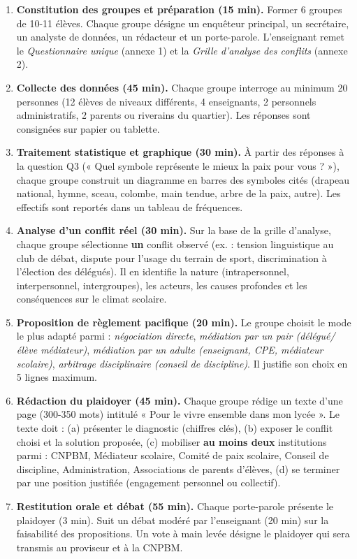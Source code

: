 \documentclass[11pt]{article}
\newcounter{popsec}
\newcounter{popsub}
\newcommand{\courssub}[1]{%
  \stepcounter{popsub}%
  \par\vspace{9pt}\noindent{\popxbold\fontsize{11.5}{13}\selectfont\color{popink}{\color{poporange}\thepopsec.\thepopsub}\hspace{6pt}#1}\par\nopagebreak\vspace{4pt}
}
\begin{document}
\courssub{Consignes}
\begin{enumerate}
    \item \textbf{Constitution des groupes et préparation (15 min).} Former 6 groupes de 10-11 élèves. Chaque groupe désigne un enquêteur principal, un secrétaire, un analyste de données, un rédacteur et un porte-parole. L'enseignant remet le \emph{Questionnaire unique} (annexe 1) et la \emph{Grille d'analyse des conflits} (annexe 2).
    \item \textbf{Collecte des données (45 min).} Chaque groupe interroge au minimum 20 personnes (12 élèves de niveaux différents, 4 enseignants, 2 personnels administratifs, 2 parents ou riverains du quartier). Les réponses sont consignées sur papier ou tablette.
    \item \textbf{Traitement statistique et graphique (30 min).} À partir des réponses à la question Q3 (« Quel symbole représente le mieux la paix pour vous ? »), chaque groupe construit un diagramme en barres des symboles cités (drapeau national, hymne, sceau, colombe, main tendue, arbre de la paix, autre). Les effectifs sont reportés dans un tableau de fréquences.
    \item \textbf{Analyse d'un conflit réel (30 min).} Sur la base de la grille d'analyse, chaque groupe sélectionne \textbf{un} conflit observé (ex. : tension linguistique au club de débat, dispute pour l'usage du terrain de sport, discrimination à l'élection des délégués). Il en identifie la nature (intrapersonnel, interpersonnel, intergroupes), les acteurs, les causes profondes et les conséquences sur le climat scolaire.
    \item \textbf{Proposition de règlement pacifique (20 min).} Le groupe choisit le mode le plus adapté parmi : \emph{négociation directe}, \emph{médiation par un pair (délégué/élève médiateur)}, \emph{médiation par un adulte (enseignant, CPE, médiateur scolaire)}, \emph{arbitrage disciplinaire (conseil de discipline)}. Il justifie son choix en 5 lignes maximum.
    \item \textbf{Rédaction du plaidoyer (45 min).} Chaque groupe rédige un texte d'une page (300-350 mots) intitulé « Pour le vivre ensemble dans mon lycée ». Le texte doit : (a) présenter le diagnostic (chiffres clés), (b) exposer le conflit choisi et la solution proposée, (c) mobiliser \textbf{au moins deux} institutions parmi : CNPBM, Médiateur scolaire, Comité de paix scolaire, Conseil de discipline, Administration, Associations de parents d'élèves, (d) se terminer par une position justifiée (engagement personnel ou collectif).
    \item \textbf{Restitution orale et débat (55 min).} Chaque porte-parole présente le plaidoyer (3 min). Suit un débat modéré par l'enseignant (20 min) sur la faisabilité des propositions. Un vote à main levée désigne le plaidoyer qui sera transmis au proviseur et à la CNPBM.
\end{enumerate}
\end{document}
